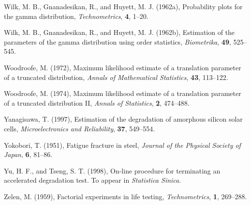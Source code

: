 \begin{thebibliography}{999}
Wilk, M. B., Gnanadesikan, R., and Huyett, M. J. (1962a), Probability
plots for the gamma distribution, {\em Technometrics}, {\bf 4}, 1--20.

Wilk, M. B., Gnanadesikan, R., and Huyett, M. J. (1962b), Estimation
of the parameters of the gamma distribution
using order statistics, {\em Biometrika}, {\bf 49}, 525--545.

Woodroofe, M. (1972), Maximum likelihood estimate of a translation
parameter of a truncated distribution, {\em Annals of Mathematical
Statistics}, {\bf 43}, 113--122.

Woodroofe, M. (1974), Maximum likelihood estimate of a translation
parameter of a truncated distribution II, {\em Annals of Statistics},
{\bf 2}, 474--488.

Yanagisawa, T. (1997), Estimation of the degradation of amorphous
silicon solar cells, {\em Microelectronics and Reliability}, {\bf 37},
549--554.

Yokobori, T. (1951), Fatigue fracture in steel, {\em Journal of the
Physical Society of Japan}, {\bf 6}, 81--86.

Yu, H. F., and Tseng, S. T. (1998), On-line procedure for
terminating an accelerated degradation test. To appear in {\em
Statistica Sinica}.

Zelen, M. (1959), Factorial experiments in life testing, {\em
Technometrics}, {\bf 1}, 269--288.

\end{thebibliography}

